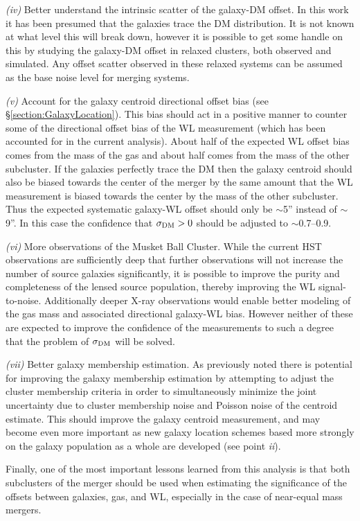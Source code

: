\textit{(iv)} Better understand the intrinsic scatter of the galaxy-DM offset.
In this work it has been presumed that the galaxies trace the DM distribution. 
It is not known at what level this will break down, however it is possible to get some handle on this by studying the galaxy-DM offset in relaxed clusters, both observed and simulated.
Any offset scatter observed in these relaxed systems can be assumed as the base noise level for merging systems.

\textit{(v)} Account for the galaxy centroid directional offset bias (see \S\ref{section:GalaxyLocation}).
This bias should act in a positive manner to counter some of the directional offset bias of the WL measurement (which has been accounted for in the current analysis).
About half of the expected WL offset bias comes from the mass of the gas and about half comes from the mass of the other subcluster.
If the galaxies perfectly trace the DM then the galaxy centroid should also be biased towards the center of the merger by the same amount that the WL measurement is biased towards the center by the mass of the other subcluster.
Thus the expected systematic galaxy-WL offset should only be $\sim$5'' instead of $\sim$9''.
In this case the confidence that $\sigma_{\rm DM}>0$ should be adjusted to $\sim$0.7--0.9. 

\textit{(vi)} More observations of the Musket Ball Cluster.
While the current HST observations are sufficiently deep that further observations will not increase the number of source galaxies significantly, it is possible to improve the purity and completeness of the lensed source population, thereby improving the WL signal-to-noise.
Additionally deeper X-ray observations would enable better modeling of the gas mass and associated directional galaxy-WL bias. 
However neither of these are expected to improve the confidence of the measurements to such a degree that the problem of $\sigma_{\rm DM}$ will be solved.

\textit{(vii)} Better galaxy membership estimation.
As previously noted there is potential for improving the galaxy membership estimation by attempting to adjust the cluster membership criteria in order to simultaneously minimize the joint uncertainty due to cluster membership noise and Poisson noise of the centroid estimate.
This should improve the galaxy centroid measurement, and may become even more important as new galaxy location schemes based more strongly on the galaxy population as a whole are developed (see point \textit{ii}).
 
 
Finally, one of the most important lessons learned from this analysis is that both subclusters of the merger should be used when estimating the significance of the offsets between galaxies, gas, and WL, especially in the case of near-equal mass mergers.


%



%
%  
